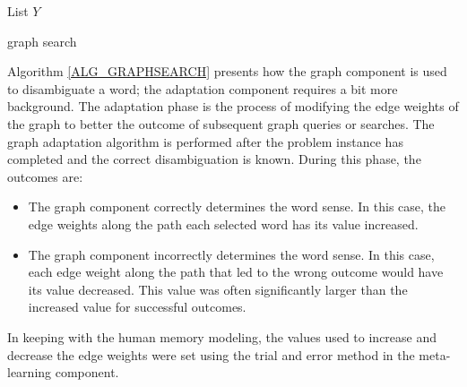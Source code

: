 \IncMargin{1em}
\begin{algorithm}
\DontPrintSemicolon
{}
\BlankLine
	List $Y$\;

	\Return {}\;
\caption{graph search\label{ALG_GRAPHSEARCH}}
\end{algorithm}\DecMargin{1em}


Algorithm \ref{ALG_GRAPHSEARCH} presents how the graph component is used to 
disambiguate a word; the adaptation component requires a bit more background. 
The adaptation phase is the process of modifying the edge weights of the graph 
to better the outcome of subsequent graph queries or searches. The graph adaptation 
algorithm is performed after the problem instance has completed and the correct 
disambiguation is known.  During this phase, the outcomes are: 

\begin{itemize}      
	\item The graph component correctly determines the word sense. 
	In this case, the edge weights along the path each selected 
	word has its value increased.
	\item The graph component incorrectly determines the word sense. 
	In this case, each edge weight along the path that led to the 
	wrong outcome would have its value decreased. This value was often significantly larger than the 
	increased value for successful outcomes.      
\end{itemize}

In keeping with the human memory modeling, the values used to increase and decrease the edge 
weights were set using the trial and error method in the meta-learning component.

